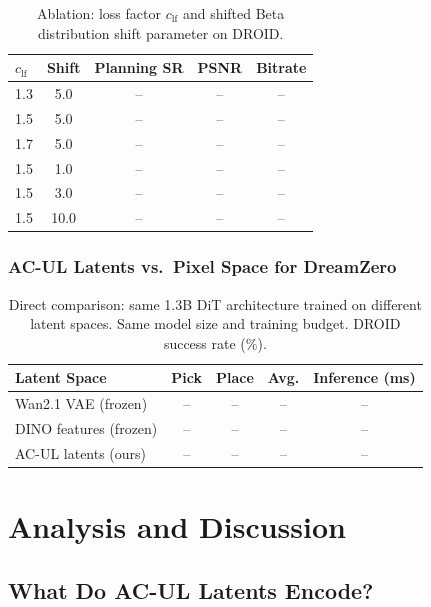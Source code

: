 \documentclass{article}
\begin{document}
\begin{table}[t]
\centering
\caption{Ablation: loss factor $c_{\text{lf}}$ and shifted Beta distribution shift parameter on DROID.}
\label{tab:ablation_lf_noise}
\begin{tabular}{lcccc}
\toprule
$c_{\text{lf}}$ & Shift & \textbf{Planning SR} & \textbf{PSNR} & \textbf{Bitrate} \\
\midrule
1.3 & 5.0   & -- & -- & -- \\
1.5 & 5.0   & -- & -- & -- \\
1.7 & 5.0   & -- & -- & -- \\
1.5 & 1.0   & -- & -- & -- \\
1.5 & 3.0   & -- & -- & -- \\
1.5 & 10.0  & -- & -- & -- \\
\bottomrule
\end{tabular}
\end{table}

\subsubsection{AC-UL Latents vs.\ Pixel Space for DreamZero}

\begin{table}[t]
\centering
\caption{Direct comparison: same 1.3B DiT architecture trained on different latent spaces. Same model size and training budget. DROID success rate (\%).}
\label{tab:ablation_latent_vs_pixel}
\begin{tabular}{lcccc}
\toprule
\textbf{Latent Space} & \textbf{Pick} & \textbf{Place} & \textbf{Avg.} & \textbf{Inference (ms)} \\
\midrule
Wan2.1 VAE (frozen)      & -- & -- & -- & -- \\
DINO features (frozen)   & -- & -- & -- & -- \\
AC-UL latents (ours)     & -- & -- & -- & -- \\
\bottomrule
\end{tabular}
\end{table}

\section{Analysis and Discussion}
\label{sec:analysis}

\subsection{What Do AC-UL Latents Encode?}
\end{document}
